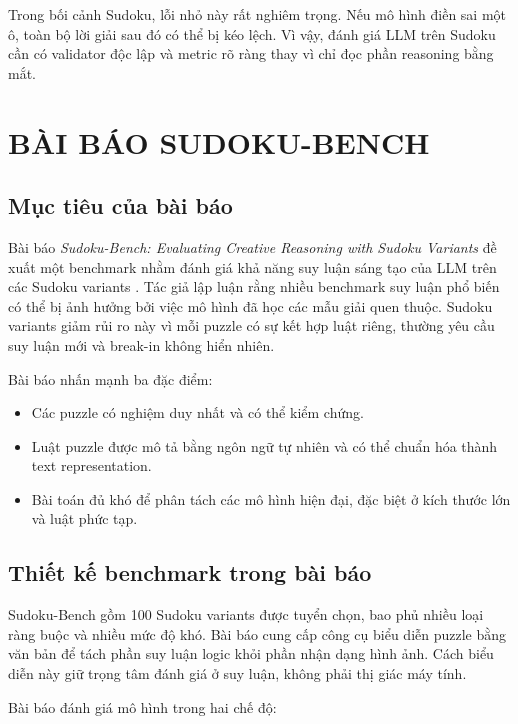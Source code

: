 \documentclass[12pt,a4paper,oneside]{report}
\newlength{\manualparindent}
\newcommand{\manualindent}{\hspace*{\manualparindent}}
\begin{document}
\manualindent%
Trong bối cảnh Sudoku, lỗi nhỏ này rất nghiêm trọng. Nếu mô hình điền sai một ô, toàn bộ lời giải sau đó có thể bị kéo lệch. Vì vậy, đánh giá LLM trên Sudoku cần có validator độc lập và metric rõ ràng thay vì chỉ đọc phần reasoning bằng mắt.

\chapter{BÀI BÁO SUDOKU-BENCH}

\section{Mục tiêu của bài báo}

\manualindent%
Bài báo \textit{Sudoku-Bench: Evaluating Creative Reasoning with Sudoku Variants} đề xuất một benchmark nhằm đánh giá khả năng suy luận sáng tạo của LLM trên các Sudoku variants \cite{sudoku-bench}. Tác giả lập luận rằng nhiều benchmark suy luận phổ biến có thể bị ảnh hưởng bởi việc mô hình đã học các mẫu giải quen thuộc. Sudoku variants giảm rủi ro này vì mỗi puzzle có sự kết hợp luật riêng, thường yêu cầu suy luận mới và break-in không hiển nhiên.

Bài báo nhấn mạnh ba đặc điểm:

\begin{itemize}
  \item Các puzzle có nghiệm duy nhất và có thể kiểm chứng.
  \item Luật puzzle được mô tả bằng ngôn ngữ tự nhiên và có thể chuẩn hóa thành text representation.
  \item Bài toán đủ khó để phân tách các mô hình hiện đại, đặc biệt ở kích thước lớn và luật phức tạp.
\end{itemize}

\section{Thiết kế benchmark trong bài báo}

\manualindent%
Sudoku-Bench gồm 100 Sudoku variants được tuyển chọn, bao phủ nhiều loại ràng buộc và nhiều mức độ khó. Bài báo cung cấp công cụ biểu diễn puzzle bằng văn bản để tách phần suy luận logic khỏi phần nhận dạng hình ảnh. Cách biểu diễn này giữ trọng tâm đánh giá ở suy luận, không phải thị giác máy tính.

Bài báo đánh giá mô hình trong hai chế độ:
\end{document}
